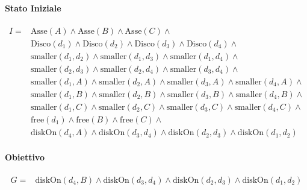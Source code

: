 \documentclass[a4paper,11pt]{article}
\begin{document}
\paragraph{Stato Iniziale}
\[
\begin{aligned}
I = & \text{Asse}(A) \land \text{Asse}(B) \land \text{Asse}(C) \land \\
& \text{Disco}(d_1) \land \text{Disco}(d_2) \land \text{Disco}(d_3) \land \text{Disco}(d_4) \land \\
& \text{smaller}(d_1, d_2) \land \text{smaller}(d_1, d_3) \land \text{smaller}(d_1, d_4) \land \\
& \text{smaller}(d_2, d_3) \land \text{smaller}(d_2, d_4) \land \text{smaller}(d_3, d_4) \land \\
& \text{smaller}(d_1, A) \land \text{smaller}(d_2, A) \land \text{smaller}(d_3, A) \land \text{smaller}(d_4, A) \land \\
& \text{smaller}(d_1, B) \land \text{smaller}(d_2, B) \land \text{smaller}(d_3, B) \land \text{smaller}(d_4, B) \land \\
& \text{smaller}(d_1, C) \land \text{smaller}(d_2, C) \land \text{smaller}(d_3, C) \land \text{smaller}(d_4, C) \land \\
& \text{free}(d_1) \land \text{free}(B) \land \text{free}(C) \land \\
& \text{diskOn}(d_4, A) \land \text{diskOn}(d_3, d_4) \land \text{diskOn}(d_2, d_3) \land \text{diskOn}(d_1, d_2)
\end{aligned}
\]

\paragraph{Obiettivo}
\[
\begin{aligned}
G = & \text{diskOn}(d_4, B) \land \text{diskOn}(d_3, d_4) \land \text{diskOn}(d_2, d_3) \land \text{diskOn}(d_1, d_2)
\end{aligned}
\]
\end{document}
